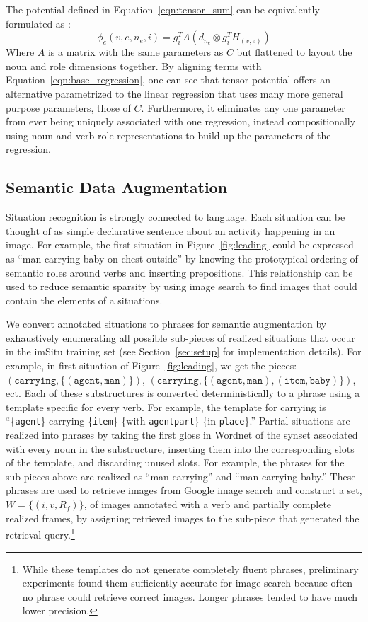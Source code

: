 \documentclass[10pt,twocolumn,letterpaper]{article}
\begin{document}
The potential defined in Equation~\ref{eqn:tensor_sum} can be equivalently formulated as :
\begin{equation}
\phi_e(v,e,n_e,i) = g_{i}^{T}A(d_{n_e} \otimes g_{i}^{T}H_{(v,e)})
\label{eqn:tensor_sum_simplified}
\end{equation}
Where $A$ is a matrix with the same parameters as $C$ but flattened to layout the noun and role dimensions together. 
By aligning terms with Equation~\ref{eqn:base_regression}, one can see that tensor potential offers an alternative parametrized to the linear regression that uses many more general purpose parameters, those of $C$.
Furthermore, it eliminates any one parameter from ever being uniquely associated with one regression, instead compositionally using noun and verb-role representations to build up the parameters of the regression. \subsection{Semantic Data Augmentation}
Situation recognition is strongly connected to language. 
Each situation can be thought of as simple declarative sentence about an activity happening in an image. 
For example, the first situation in Figure~\ref{fig:leading} could be expressed as ``man carrying baby on chest outside'' by knowing the prototypical ordering of semantic roles around verbs and inserting prepositions.
This relationship can be used to reduce semantic sparsity by using image search to find images that could contain the elements of a situations.

We convert annotated situations to phrases for semantic augmentation by exhaustively enumerating all possible sub-pieces of realized situations that occur in the imSitu training set (see Section~\ref{sec:setup} for implementation details). 
For example, in first situation of Figure~\ref{fig:leading}, we get the pieces: {\small $(\texttt{carrying},\{(\texttt{agent}, \texttt{man})\})$},
{\small$(\texttt{carrying},\{(\texttt{agent},\texttt{man}),(\texttt{item},\texttt{baby})\})$}, ect.
Each of these substructures is converted deterministically to a phrase using a template specific for every verb. 
For example, the template for carrying is ``\{\texttt{agent}\} carrying \{\texttt{item}\} \{with \texttt{agentpart}\} \{in \texttt{place}\}.''
Partial situations are realized into phrases by taking the first gloss in Wordnet of the synset associated with every noun in the substructure, inserting them into the corresponding slots of the template, and discarding unused slots.
For example, the phrases for the sub-pieces above are realized as ``man carrying'' and ``man carrying baby.'' 
These phrases are used to retrieve images from Google image search and construct a set, $W = \{(i,v,R_f)\}$, of images annotated with a verb and partially complete realized frames, by assigning retrieved images to the sub-piece that generated the retrieval query.\footnote{While these templates do not generate completely fluent phrases, preliminary experiments found them sufficiently accurate for image search because often no phrase could retrieve correct images. Longer phrases tended to have much lower precision.}
\end{document}
